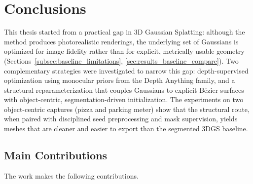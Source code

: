 ﻿\chapter{Conclusions}

This thesis started from a practical gap in 3D Gaussian Splatting: although the method produces photorealistic renderings, the underlying set of Gaussians is optimized for image fidelity rather than for explicit, metrically usable geometry (Sections~\ref{subsec:baseline_limitations}, \ref{sec:results_baseline_compare}). Two complementary strategies were investigated to narrow this gap: depth-supervised optimization using monocular priors from the Depth Anything family, and a structural reparameterization that couples Gaussians to explicit B\'ezier surfaces with object-centric, segmentation-driven initialization. The experiments on two object-centric captures (pizza and parking meter) show that the structural route, when paired with disciplined seed preprocessing and mask supervision, yields meshes that are cleaner and easier to export than the segmented 3DGS baseline.

\section{Main Contributions}

The work makes the following contributions.

